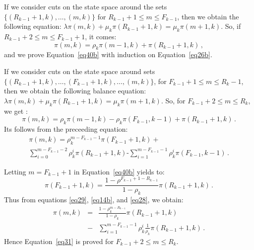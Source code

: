 \documentclass[conference]{IEEEtran}
\begin{document}
\begin{IEEEproof}
If we consider cuts on the state space around the sets $\{(R_{k-1}+1,k), \ldots,(m,k)\}$ for  $R_{k-1}+1 \leq m \leq F_{k-1}$, then we obtain
the following equation: $\lambda \pi(m,k) + \mu_k \pi(R_{k-1}+1,k) = \mu_k \pi(m+1,k)$.
So, if $ R_{k-1}+2 \leq m \leq F_{k-1}+1$, it comes:
\begin{equation}
\pi(m,k) = \rho_k \pi(m-1,k)+ \pi(R_{k-1}+1,k) \, ,
\label{eq26b}
\end{equation} 
and we prove Equation~\eqref{eq40b} with induction on Equation~\eqref{eq26b}.

If we consider cuts on the state space around sets $\{(R_{k-1}+1,k), \ldots,(F_{k-1}+1,k),\ldots,(m,k)\}$, for  $F_{k-1}+1 \leq m \leq R_{k}-1$,
then we obtain the following balance equation: $\lambda \pi(m,k) + \mu_k \pi(R_{k-1}+1,k)=\mu_k \pi(m+1,k)$. 
So, for $F_{k-1}+2 \leq m \leq R_{k}$, we get :
\begin{equation}
\pi(m,k) = \rho_k \pi(m-1,k)-\rho_k \pi(F_{k- \!1},k-\!1)+ \pi(R_{k-1} \! + \!1,k) \, .
\label{eq26}
\end{equation}
Its follows from the preceeding equation:
\begin{multline}\label{eq28}
\pi(m,k) = \rho_k^{m-F_{k-1}-1}\pi(F_{k-1}+1,k)+ \\
\sum_{i=0}^{m-F_{k-1}-2} \rho_k^i\pi(R_{k-1}+1,k)\mbox{-}\sum_{i=1}^{m-F_{k-1}-1} \rho_k^i \pi(F_{k-1},k-1) \, .
\end{multline}

Letting $m=F_{k-1}+1$ in Equation~\eqref{eq40b} yields to:
\begin{equation}
\pi(F_{k-1}+1,k)=\frac{1-\rho^{ F_{k-1}+1-R_{k-1}} }{1-\rho_k}\pi(R_{k-1}+1,k) \, .
\label{eq29}
\end{equation} 
Thus from equations \eqref{eq29}, \eqref{eq14b}, and \eqref{eq28},  we obtain:
\begin{eqnarray}
\pi(m,k)&=&\frac{1-\rho_k^{m-R_{k-1}} } {1-\rho_k} \pi(R_{k-1}+1,k) \nonumber\\
&-& \sum_{i=1}^{m-F_{k-1}-1} \rho_k^i \frac{1}{\rho_k} \pi(R_{k-1}+1,k) \, .
\label{eq30}
\end{eqnarray} 
Hence Equation~\eqref{eq31} is proved for $F_{k-1}+2 \leq m \leq R_{k}$. 


\end{IEEEproof}
\end{document}
